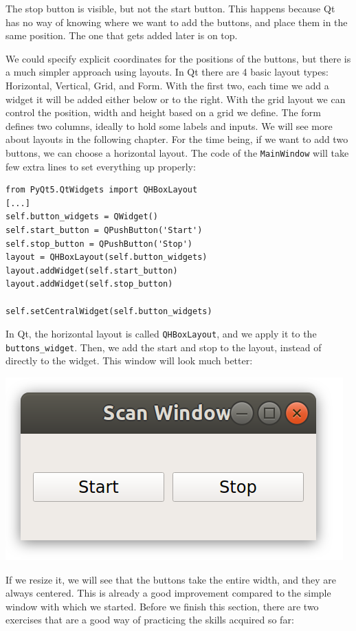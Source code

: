 The stop button is visible, but not the start button. This happens because Qt has no way of knowing where we want to add the buttons, and place them in the same position. The one that gets added later is on top.


We could specify explicit coordinates for the positions of the buttons, but there is a much simpler approach using layouts. In Qt there are 4 basic layout types: Horizontal, Vertical, Grid, and Form. With the first two, each time we add a widget it will be added either below or to the right. With the grid layout we can control the position, width and height based on a grid we define. The form defines two columns, ideally to hold some labels and inputs. We will see more about layouts in the following chapter. For the time being, if we want to add two buttons, we can choose a horizontal layout. The code of the \texttt{MainWindow} will take few extra lines to set everything up properly:

\begin{verbatim}
from PyQt5.QtWidgets import QHBoxLayout
[...]
self.button_widgets = QWidget()
self.start_button = QPushButton('Start')
self.stop_button = QPushButton('Stop')
layout = QHBoxLayout(self.button_widgets)
layout.addWidget(self.start_button)
layout.addWidget(self.stop_button)

self.setCentralWidget(self.button_widgets)
\end{verbatim}

In Qt, the horizontal layout is called \texttt{QHBoxLayout}, and we apply it to the \texttt{buttons\_widget}. Then, we add the start and stop to the layout, instead of directly to the widget. This window will look much better:

\begin{center}
    \includegraphics[width=.3\textwidth]{images/Chapter_08/06_window_with_layout.png}
\end{center}

If we resize it, we will see that the buttons take the entire width, and they are always centered. This is already a good improvement compared to the simple window with which we started. Before we finish this section, there are two exercises that are a good way of practicing the skills acquired so far:

